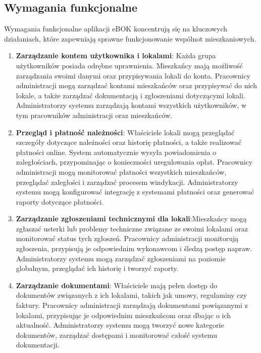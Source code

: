 \subsection{Wymagania funkcjonalne}

Wymagania funkcjonalne aplikacji eBOK koncentrują się na kluczowych działaniach, które zapewniają sprawne funkcjonowanie wspólnot mieszkaniowych.

\begin{enumerate}[label=\arabic*.,labelwidth=\widthof{10}]

    \item \textbf{Zarządzanie kontem użytkownika i lokalami}: Każda grupa użytkowników posiada odrębne uprawnienia. Mieszkańcy mają możliwość zarządzania swoimi danymi oraz przypisywania lokali do konta. Pracownicy administracji mogą zarządzać kontami mieszkańców oraz przypisywać do nich lokale, a także zarządzać dokumentacją i zgłoszeniami dotyczącymi lokali. Administratorzy systemu zarządzają kontami wszystkich użytkowników, w tym pracowników administracji oraz mieszkańców.

	\item \textbf{Przegląd i płatność należności}: Właściciele lokali mogą przeglądać szczegóły dotyczące należności oraz historię płatności, a także realizować płatności online. System automatycznie wysyła powiadomienia o zaległościach, przypominając o konieczności uregulowania opłat. Pracownicy administracji mogą monitorować płatności wszystkich mieszkańców, przeglądać zaległości i zarządzać procesem windykacji. Administratorzy systemu mogą konfigurować integrację z systemami płatności oraz generować raporty dotyczące płatności.

	\item \textbf{Zarządzanie zgłoszeniami technicznymi dla lokali}:Mieszkańcy mogą zgłaszać usterki lub problemy techniczne związane ze swoimi lokalami oraz monitorować status tych zgłoszeń. Pracownicy administracji monitorują zgłoszenia, przypisują je odpowiednim wykonawcom i śledzą postęp napraw. Administratorzy systemu mogą zarządzać zgłoszeniami na poziomie globalnym, przeglądać ich historię i tworzyć raporty.

	\item \textbf{Zarządzanie dokumentami}: Właściciele mają pełen dostęp do dokumentów związanych z ich lokalami, takich jak umowy, regulaminy czy faktury. Pracownicy administracji zarządzają dokumentami powiązanymi z lokalami, przypisując je odpowiednim mieszkańcom oraz dbając o ich aktualność. Administratorzy systemu mogą tworzyć nowe kategorie dokumentów, zarządzać dostępami i monitorować całość systemu dokumentacji.


\end{enumerate}

